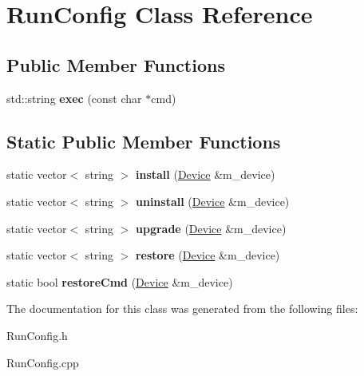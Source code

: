 \hypertarget{classRunConfig}{}\section{Run\+Config Class Reference}
\label{classRunConfig}
\subsection*{Public Member Functions}
\begin{DoxyCompactItemize}
\item 
\mbox{\label{classRunConfig_a482650ee4f8468857fb60fc6a5a8b62a}} 
std\+::string {\bfseries exec} (const char $\ast$cmd)
\end{DoxyCompactItemize}
\subsection*{Static Public Member Functions}
\begin{DoxyCompactItemize}
\item 
\mbox{\label{classRunConfig_a5bf30574ec8400f70c03fa73aec39143}} 
static vector$<$ string $>$ {\bfseries install} (\hyperlink{classDevice}{Device} \&m\+\_\+device)
\item 
\mbox{\label{classRunConfig_a4faba2a90a4a9f7f5848d98afe68bbe6}} 
static vector$<$ string $>$ {\bfseries uninstall} (\hyperlink{classDevice}{Device} \&m\+\_\+device)
\item 
\mbox{\label{classRunConfig_a09e13b480e957af436d9fa072f3c803b}} 
static vector$<$ string $>$ {\bfseries upgrade} (\hyperlink{classDevice}{Device} \&m\+\_\+device)
\item 
\mbox{\label{classRunConfig_adc4527f1397bf44a015659fa67cfcfd8}} 
static vector$<$ string $>$ {\bfseries restore} (\hyperlink{classDevice}{Device} \&m\+\_\+device)
\item 
\mbox{\label{classRunConfig_a630df6ad6f2bab17feba3c31c0a1fdf5}} 
static bool {\bfseries restore\+Cmd} (\hyperlink{classDevice}{Device} \&m\+\_\+device)
\end{DoxyCompactItemize}


The documentation for this class was generated from the following files\+:\begin{DoxyCompactItemize}
\item 
Run\+Config.\+h\item 
Run\+Config.\+cpp\end{DoxyCompactItemize}
